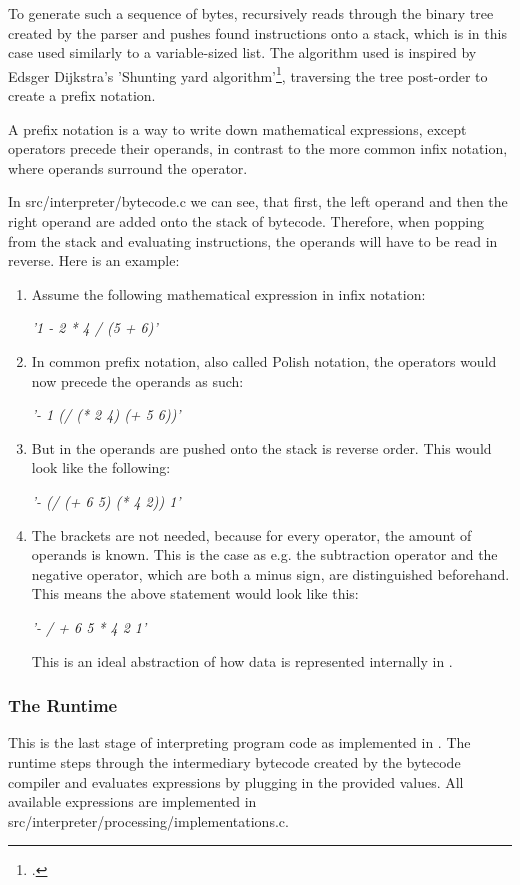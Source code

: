 \documentclass[12pt,a4paper,man]{apa7}
\newcommand{\expr}[1] {
    \begin{center}
        #1
    \end{center}
}
\begin{document}
To generate such a sequence of bytes, \name recursively reads through the
binary tree created by the parser and pushes found instructions onto a stack,
which is in this case used similarly to a variable-sized list.
The algorithm used is inspired by Edsger Dijkstra's 'Shunting yard 
algorithm'\footcite{shunting_yard}, traversing the tree post-order to create
a prefix notation. 

A prefix notation is a way to write down mathematical expressions, except
operators precede their operands, in contrast to the more common infix notation,
where operands surround the operator.

In src/interpreter/bytecode.c we can see, that first, the left operand and then
the right operand are added onto the stack of bytecode. Therefore, when
popping from the stack and evaluating instructions, the operands will have to
be read in reverse.
Here is an example:
\begin{enumerate}
    \item Assume the following mathematical expression in infix notation:
        \expr{\emph{'1 - 2 * 4 / (5 + 6)'}}
    \item In common prefix notation, also called Polish notation, the
        operators would now precede the operands as such:
        \expr{\emph{'- 1 (/ (* 2 4) (+ 5 6))'}}
    \item But in \name the operands are pushed onto the stack is reverse order.
        This would look like the following:
        \expr{\emph{'- (/ (+ 6 5) (* 4 2)) 1'}}
    \item The brackets are not needed, because for every operator, the amount
        of operands is known. This is the case as e.g. the subtraction operator
        and the negative operator, which are both a minus sign, are distinguished
        beforehand. This means the above statement would look like this:
        \expr{\emph{'- / + 6 5 * 4 2 1'}}
        This is an ideal abstraction of how data 
        is represented internally in \name.
\end{enumerate}

\subsubsection{The Runtime}
This is the last stage of interpreting program code as implemented in \name.
The runtime steps through the intermediary bytecode created by the bytecode
compiler and evaluates expressions by plugging in the provided values.
All available expressions are implemented in 
src/interpreter/processing/implementations.c.
\end{document}
